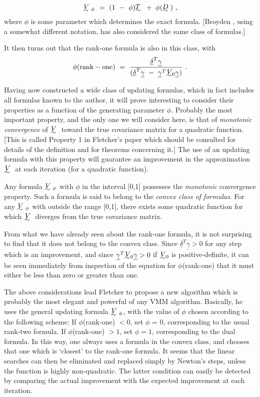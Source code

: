 $$\UTV_{\phi}~=~(1~-~\phi)\UTT~+~\phi(\UTD)~,$$
 where  $\phi$ is some parameter which determines the exact formula.  [Broyden \cite{Broy},
using a somewhat different notation, has also considered the same class
of formulas.]
 
     It then turns out that the rank-one formula is also in this class,
 with
 $$\phi({\rm rank-one)}~=~{{\underline{\delta}}^T{\underline{\gamma}}\over
({\underline{\delta}}^T{\underline{\gamma}}~-~
{\underline{\gamma}}^T\UTV\!\!_0{\underline{\gamma}})}~.$$
 
     Having now constructed a wide class of updating formulas, which in
fact includes all formulas known to the author, it will prove interesting
to consider their properties as a function of the generating parameter $\phi$.
Probably the most important property, and the only one we will consider
here, is that of {\em monotonic convergence} of $\UTV$ toward the true covariance
matrix for a quadratic function.  [This is called Property 1 in Fletcher's
paper \cite{Flet2} which should be consulted for details of the definition and for
theorems concerning it.]  The use of an updating formula with this
property will guarantee an improvement in the approximation $\UTV$ at each
iteration (for a quadratic function).
 
     Any formula $\UTV_{\phi}$ with $\phi$ in the interval [0,1] possesses the {\em monotonic}
convergence property.  Such a formula is said to belong to the {\em convex
class of formulas}. For any $\UTV_{\phi}$ with  outside the range [0,1], there
exists some quadratic function for which $\UTV$ diverges from the true
covariance matrix.
 
     From what we have already seen about the rank-one formula, it is
not surprising to find that it does not belong to the convex class.
Since  ${\underline{\delta}}^T{\underline{\gamma}} > 0$ for any step which is an improvement, 
and since ${\underline{\gamma}}^T\UTV\!\!_0{\underline{\gamma}} > 0$
if $\UTV\!\!_0$ is positive-definite, it can be seen immediately from inspection
of the equation for $\phi$(rank-one) that it must either be less than zero
or greater than one.
 
     The above considerations lead Fletcher to propose a new algorithm \cite{Flet2}
which is probably the most elegant and powerful of any VMM algorithm. 
Basically, he uses the general updating formula $\UTV_{\phi}$, with the value of $\phi$
chosen according to the following scheme:  If $\phi$(rank-one) $< 0$, set $\phi$ = 0,
corresponding to the usual  rank-two formula.  If $\phi$(rank-one) $> 1$, set
$\phi = 1$, corresponding to the dual formula. In this way, one always uses
a formula in the convex class, and chooses that one which is `closest'
to the rank-one formula.  It seems that the linear searches can then be
eliminated and replaced simply by Newton's steps, unless the function
is highly non-quadratic.  The latter condition can easily be detected by
comparing the actual improvement with the expected improvement at
each iteration.
 
